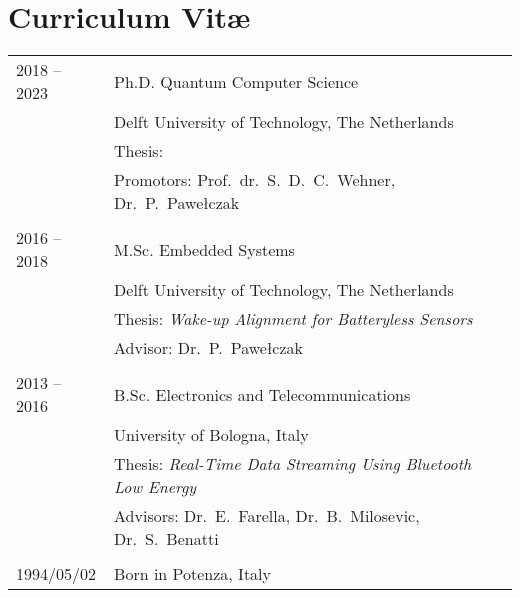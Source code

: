 \chapter*{Curriculum Vit\ae}

\makeatletter
\authors{\@firstname\ {\titleshape\@lastname}}
\def\thesistitle{\@title}
\makeatother

\setlength{\tabcolsep}{0cm}
\noindent
\begin{tabularx}{\linewidth}{p{2cm}X}
    2018 -- 2023 & Ph.D. Quantum Computer Science \\
                 & Delft University of Technology, The Netherlands \\
                 & Thesis: \emph{\thesistitle} \\
                 & Promotors: Prof.\ dr.\ S.\ D.\ C.\ Wehner, Dr.\ P.\ Pawełczak \\
    \\
    2016 -- 2018 & M.Sc. Embedded Systems \\
                 & Delft University of Technology, The Netherlands \\
                 & Thesis: \emph{Wake-up Alignment for Batteryless Sensors} \\
                 & Advisor: Dr.\ P.\ Pawełczak \\
    \\
    2013 -- 2016 & B.Sc. Electronics and Telecommunications \\
                 & University of Bologna, Italy \\
                 & Thesis: \emph{Real-Time Data Streaming Using Bluetooth Low Energy} \\
                 & Advisors: Dr.\ E.\ Farella, Dr.\ B.\ Milosevic, Dr.\ S.\ Benatti \\
    \\
    1994/05/02   & Born in Potenza, Italy \\
\end{tabularx}
